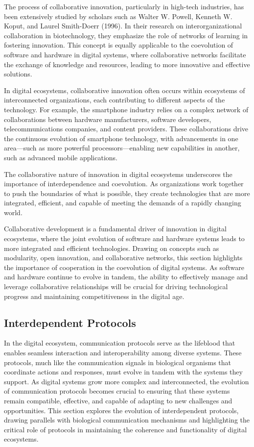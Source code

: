 \documentclass[12pt,twoside]{article}
\begin{document}
The process of collaborative innovation, particularly in high-tech industries, has been extensively studied by scholars such as Walter W. Powell, Kenneth W. Koput, and Laurel Smith-Doerr (1996). In their research on interorganizational collaboration in biotechnology, they emphasize the role of networks of learning in fostering innovation. This concept is equally applicable to the coevolution of software and hardware in digital systems, where collaborative networks facilitate the exchange of knowledge and resources, leading to more innovative and effective solutions.

In digital ecosystems, collaborative innovation often occurs within ecosystems of interconnected organizations, each contributing to different aspects of the technology. For example, the smartphone industry relies on a complex network of collaborations between hardware manufacturers, software developers, telecommunications companies, and content providers. These collaborations drive the continuous evolution of smartphone technology, with advancements in one area—such as more powerful processors—enabling new capabilities in another, such as advanced mobile applications.

The collaborative nature of innovation in digital ecosystems underscores the importance of interdependence and coevolution. As organizations work together to push the boundaries of what is possible, they create technologies that are more integrated, efficient, and capable of meeting the demands of a rapidly changing world.

Collaborative development is a fundamental driver of innovation in digital ecosystems, where the joint evolution of software and hardware systems leads to more integrated and efficient technologies. Drawing on concepts such as modularity, open innovation, and collaborative networks, this section highlights the importance of cooperation in the coevolution of digital systems. As software and hardware continue to evolve in tandem, the ability to effectively manage and leverage collaborative relationships will be crucial for driving technological progress and maintaining competitiveness in the digital age.

\subsection{Interdependent Protocols}

In the digital ecosystem, communication protocols serve as the lifeblood that enables seamless interaction and interoperability among diverse systems. These protocols, much like the communication signals in biological organisms that coordinate actions and responses, must evolve in tandem with the systems they support. As digital systems grow more complex and interconnected, the evolution of communication protocols becomes crucial to ensuring that these systems remain compatible, effective, and capable of adapting to new challenges and opportunities. This section explores the evolution of interdependent protocols, drawing parallels with biological communication mechanisms and highlighting the critical role of protocols in maintaining the coherence and functionality of digital ecosystems.
\end{document}
